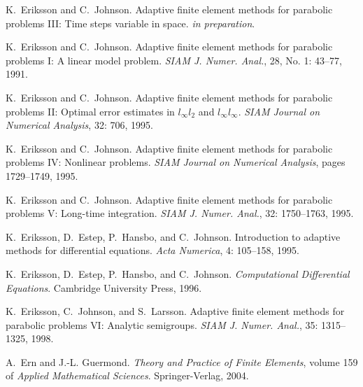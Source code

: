 \begin{thebibliography}{467}
K.~Eriksson and C.~Johnson.
\newblock Adaptive finite element methods for parabolic problems {III}: {T}ime
  steps variable in space.
\newblock \emph{in preparation}.

K.~Eriksson and C.~Johnson.
\newblock Adaptive finite element methods for parabolic problems {I}: {A}
  linear model problem.
\newblock \emph{SIAM J. Numer. Anal.}, 28, No. 1: 43--77, 1991.

K.~Eriksson and C.~Johnson.
\newblock Adaptive finite element methods for parabolic problems {II}: Optimal
  error estimates in $l_\infty l_2$ and $l_\infty l_\infty$.
\newblock \emph{SIAM Journal on Numerical Analysis}, 32: 706,
  1995{}.

K.~Eriksson and C.~Johnson.
\newblock Adaptive finite element methods for parabolic problems {IV}:
  Nonlinear problems.
\newblock \emph{SIAM Journal on Numerical Analysis}, pages 1729--1749,
  1995{}.

K.~Eriksson and C.~Johnson.
\newblock Adaptive finite element methods for parabolic problems {V}:
  {L}ong-time integration.
\newblock \emph{SIAM J. Numer. Anal.}, 32: 1750--1763,
  1995{}.

K.~Eriksson, D.~Estep, P.~Hansbo, and C.~Johnson.
\newblock Introduction to adaptive methods for differential equations.
\newblock \emph{Acta Numerica}, 4: 105--158, 1995.

K.~Eriksson, D.~Estep, P.~Hansbo, and C.~Johnson.
\newblock \emph{Computational Differential Equations}.
\newblock Cambridge University Press, 1996.

K.~Eriksson, C.~Johnson, and S.~Larsson.
\newblock Adaptive finite element methods for parabolic problems {VI}:
  {A}nalytic semigroups.
\newblock \emph{SIAM J. Numer. Anal.}, 35: 1315--1325, 1998.

A.~Ern and J.-L. Guermond.
\newblock \emph{Theory and Practice of Finite Elements}, volume 159 of
  \emph{Applied Mathematical Sciences}.
\newblock Springer-Verlag, 2004.


\end{thebibliography}
